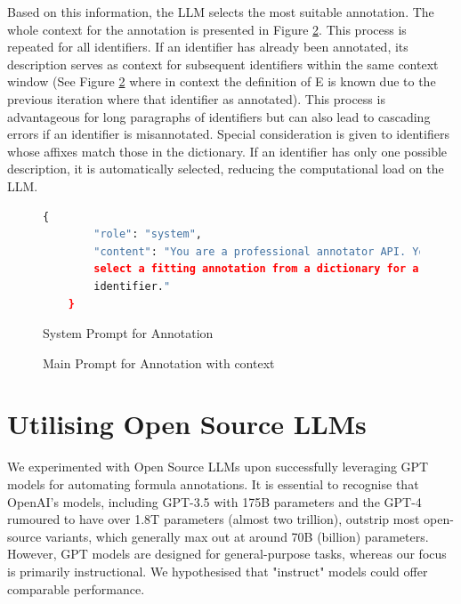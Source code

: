 Based on this information, the LLM selects the most suitable annotation. The whole context for the annotation is presented in Figure \ref{fig:prompt_anno_main}. This process is repeated for all identifiers. If an identifier has already been annotated, its description serves as context for subsequent identifiers within the same context window (See Figure \ref{fig:prompt_anno_main} where in context the definition of E is known due to the previous iteration where that identifier as annotated). This process is advantageous for long paragraphs of identifiers but can also lead to cascading errors if an identifier is misannotated. Special consideration is given to identifiers whose affixes match those in the dictionary. If an identifier has only one possible description, it is automatically selected, reducing the computational load on the LLM.

\begin{figure}[htpb]
  \centering
  \begin{lstlisting}[language=python]
    {
        "role": "system",
        "content": "You are a professional annotator API. Your job is to 
        select a fitting annotation from a dictionary for a mathematical
        identifier."
    }
  \end{lstlisting}
  \caption[System Prompt for Annotation]{System Prompt for Annotation}\label{fig:prompt_anno_system}
\end{figure}

\begin{figure}[htpb]
  \centering
  \quad 
  \caption[User Prompt for Annotation]{Main Prompt for Annotation with context}\label{fig:prompt_anno_main}
\end{figure}

\section{Utilising Open Source LLMs}

We experimented with Open Source LLMs upon successfully leveraging GPT models for automating formula annotations. It is essential to recognise that OpenAI's models, including GPT-3.5 with 175B parameters and the GPT-4 rumoured to have over 1.8T parameters (almost two trillion), outstrip most open-source variants, which generally max out at around 70B (billion) parameters. However, GPT models are designed for general-purpose tasks, whereas our focus is primarily instructional. We hypothesised that "instruct" models could offer comparable performance.

